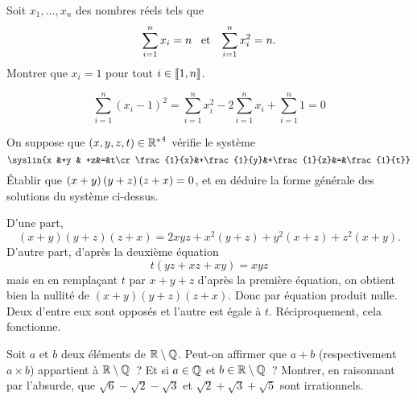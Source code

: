 \documentclass{magnolia}
\begin{document}
Soit $x_1,\ldots,x_n$ des nombres réels tels que
\[\sum_{i=1}^nx_i=n \quad\!\text{et}\quad\! \sum_{i=1}^nx_i^2=n.\]
Montrer que $x_i=1$ pour tout $i\in\left\llbracket 1,n\right\rrbracket$.

\begin{sol}
$$\sum_{i=1}^n(x_i-1)^2=\sum_{i=1}^nx_i^2-2\sum_{i=1}^nx_i+\sum_{i=1}^n 1=0$$
\end{sol}

On suppose que $\left(x,y,z,t\right)\in{\mathbb{R}^*}^4$ vérifie le système
\[\syslin{x          &+y          &          +z&=&t\cr
          \frac{1}{x}&+\frac{1}{y}&+\frac{1}{z}&=&\frac{1}{t}}\]
Établir que $\left(x+y\right)\left(y+z\right)\left(z+x\right)=0$, et en déduire la forme générale des
solutions du système ci-dessus.

\begin{sol}
D'une part, $$(x+y)(y+z)(z+x)=2xyz+x^2(y+z)+y^2(x+z)+z^2(x+y).$$
D'autre part, d'après la deuxième équation $$t(yz+xz+xy)=xyz$$ mais en en remplaçant $t$ par $x+y+z$ d'après la première équation, on obtient bien la nullité de $(x+y)(y+z)(z+x)$.
Donc par équation produit nulle. Deux d'entre eux sont opposés et l'autre est égale à $t$. Réciproquement, cela fonctionne.
\end{sol}








\begin{questions}
\question Soit $a$ et $b$ deux éléments de $\mathbb{R}\setminus\mathbb{Q}$. Peut-on affirmer
  que $a+b$ (respectivement $a\times b$) appartient à $\mathbb{R}\setminus\mathbb{Q}$~?
  Et si $a\in\mathbb{Q}$ et $b\in\mathbb{R}\setminus\mathbb{Q}$~?
\question Montrer, en raisonnant par l'absurde, que $\sqrt{6}-\sqrt{2}-\sqrt{3}$ et
  $\sqrt{2}+\sqrt{3}+\sqrt{5}$ sont irrationnels.
\end{questions}
\end{document}
